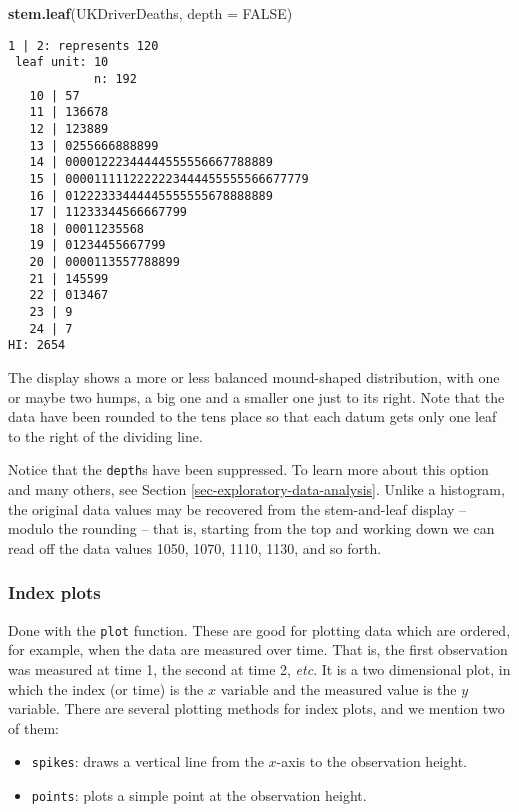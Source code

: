 \documentclass[]{book}
\newenvironment{Shaded}{\begin{snugshade}}{\end{snugshade}}
\newcommand{\KeywordTok}[1]{\textcolor[rgb]{0.13,0.29,0.53}{\textbf{{#1}}}}
\newcommand{\DataTypeTok}[1]{\textcolor[rgb]{0.13,0.29,0.53}{{#1}}}
\newcommand{\OtherTok}[1]{\textcolor[rgb]{0.56,0.35,0.01}{{#1}}}
\newcommand{\NormalTok}[1]{{#1}}
\providecommand{\tightlist}{%
  \setlength{\itemsep}{0pt}\setlength{\parskip}{0pt}}
\numberwithin{equation}{chapter}
\numberwithin{figure}{chapter}
\theoremstyle{plain}
\theoremstyle{definition}
\theoremstyle{remark}
\theoremstyle{definition}
\theoremstyle{definition}
\theoremstyle{remark}
\begin{document}
\begin{Shaded}
\begin{Highlighting}[]
\KeywordTok{stem.leaf}\NormalTok{(UKDriverDeaths, }\DataTypeTok{depth =} \OtherTok{FALSE}\NormalTok{)}
\end{Highlighting}
\end{Shaded}

\begin{verbatim}
1 | 2: represents 120
 leaf unit: 10
            n: 192
   10 | 57
   11 | 136678
   12 | 123889
   13 | 0255666888899
   14 | 00001222344444555556667788889
   15 | 0000111112222223444455555566677779
   16 | 01222333444445555555678888889
   17 | 11233344566667799
   18 | 00011235568
   19 | 01234455667799
   20 | 0000113557788899
   21 | 145599
   22 | 013467
   23 | 9
   24 | 7
HI: 2654
\end{verbatim}

The display shows a more or less balanced mound-shaped distribution,
with one or maybe two humps, a big one and a smaller one just to its
right. Note that the data have been rounded to the tens place so that
each datum gets only one leaf to the right of the dividing line.

Notice that the \texttt{depth}s  have been suppressed. To
learn more about this option and many others, see Section
\ref{sec-exploratory-data-analysis}. Unlike a histogram, the original
data values may be recovered from the stem-and-leaf display -- modulo
the rounding -- that is, starting from the top and working down we can
read off the data values 1050, 1070, 1110, 1130, and so forth.

\subsubsection{Index plots}\label{index-plots}

Done with the \texttt{plot}  function. These
are good for plotting data which are ordered, for example, when the data
are measured over time. That is, the first observation was measured at
time 1, the second at time 2, \emph{etc}. It is a two dimensional plot,
in which the index (or time) is the \(x\) variable and the measured
value is the \(y\) variable. There are several plotting methods for
index plots, and we mention two of them:

\begin{itemize}
\tightlist
\item
  \texttt{spikes}: draws a vertical line from the \(x\)-axis to the
  observation height.
\item
  \texttt{points}: plots a simple point at the observation height.
\end{itemize}
\end{document}
